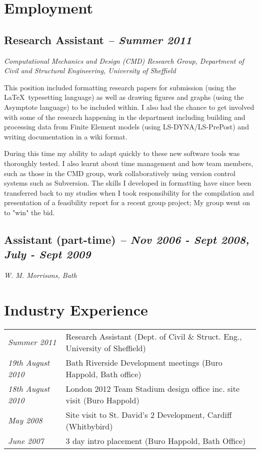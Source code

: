\documentclass[a4paper]{article}
\begin{document}
\section*{Employment}

\subsection*{Research Assistant {\it -- Summer 2011}}
{\it Computational Mechanics and Design (CMD) Research Group, Department of Civil and Structural Engineering, University of Sheffield}

This position included formatting research papers for submission (using the \LaTeX~typesetting language) as well as drawing figures and graphs (using the Asymptote language) to be included within. I also had the chance to get involved with some of the research happening in the department including building and processing data from Finite Element models (using LS-DYNA/LS-PrePost) and writing documentation in a wiki format.

During this time my ability to adapt quickly to these new software tools was thoroughly tested. I also learnt about time management and how team members, such as those in the CMD group, work collaboratively using version control systems such as Subversion. The skills I developed in formatting have since been transferred back to my studies when I took responsibility for the compilation and presentation of a feasibility report for a recent group project; My group went on to "win" the bid.

\subsection*{Assistant (part-time) {\it -- Nov 2006 - Sept 2008, July - Sept 2009}}
{\it W. M. Morrisons, Bath}

\section*{Industry Experience}

\hspace{-6pt}\begin{tabular}{>{\it}ll}
Summer 2011 & Research Assistant (Dept. of Civil \& Struct. Eng., University of Sheffield) \\
19th August 2010 & Bath Riverside Development meetings (Buro Happold, Bath office) \\
18th August 2010	 & London 2012 Team Stadium design office inc. site visit (Buro Happold) \\
May 2008	 & Site visit to St. David's 2 Development, Cardiff (Whitbybird) \\
June 2007 & 3 day intro placement (Buro Happold, Bath Office)
\end{tabular}
\end{document}
